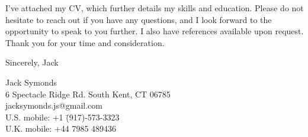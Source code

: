 \documentclass[a4paper, 12pt]{article}
\begin{document}
\vspace{1em}
I've attached my CV, which further details my skills and education. Please do not hesitate to reach out if you have any questions, and I look forward to the opportunity to speak to you further. I also have references available upon request. Thank you for your time and consideration.

\vspace{2em}
\noindent Sincerely,
\newline Jack

\vspace{2em}
\color{fade} 

\begin{tabbing}
Jack Symonds
\\ 6 Spectacle Ridge Rd. South Kent, CT 06785
\\ jacksymonds.js@gmail.com
\\ U.S. mobile: +1 \= (917)-573-3323
\\ U.K. mobile: +44 \= 7985 489436
\end{tabbing}
\end{document}
